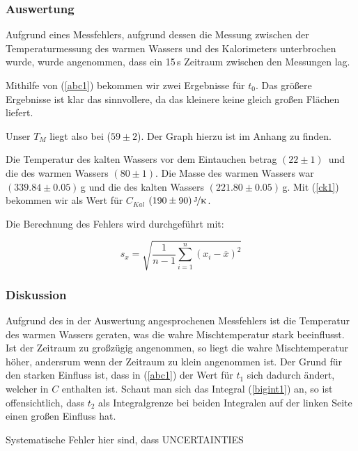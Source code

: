 \documentclass[11pt,a4paper]{article}
\begin{document}
\subsubsection{Auswertung}

Aufgrund eines Messfehlers, aufgrund dessen die Messung zwischen der Temperaturmessung des warmen Wassers und des Kalorimeters unterbrochen wurde, wurde angenommen, dass ein 15\,s Zeitraum zwischen den Messungen lag.

Mithilfe von (\ref{abc1}) bekommen wir zwei Ergebnisse f\"ur $t_0$. Das gr\"o\ss ere Ergebnisse ist klar das sinnvollere, da das kleinere keine gleich gro\ss en Fl\"achen liefert.

Unser $T_M$ liegt also bei ($59\pm2$)\celsius. Der Graph hierzu ist im Anhang zu finden.

Die Temperatur des kalten Wassers vor dem Eintauchen betrag $(22\pm1)$\celsius \ und die des warmen Wassers $(80\pm1)$\celsius. Die Masse des warmen Wassers war $(339.84\pm0.05)$\,g und die des kalten Wassers $(221.80\pm0.05)$\,g. Mit (\ref{ck1}) bekommen wir als Wert f\"ur $C_{Kal}$ $(190\pm90)\,\nicefrac{\mathrm{J}}{\mathrm{K}}$.

Die Berechnung des Fehlers wird durchgef\"uhrt mit:

\begin{equation}
s_x=\sqrt{\frac{1}{n-1}\sum_{i=1}^n(x_i-\overline{x})^2}\label{uncertainty1}
\end{equation}





\subsubsection{Diskussion}

Aufgrund des in der Auswertung angesprochenen Messfehlers ist die Temperatur des warmen Wassers geraten, was die wahre Mischtemperatur stark beeinflusst. Ist der Zeitraum zu gro\ss z\"ugig angenommen, so liegt die wahre Mischtemperatur h\"oher, andersrum wenn der Zeitraum zu klein angenommen ist. Der Grund f\"ur den starken Einfluss ist, dass in (\ref{abc1}) der Wert f\"ur $t_1$ sich dadurch \"andert, welcher in $C$ enthalten ist. Schaut man sich das Integral (\ref{bigint1}) an, so ist offensichtlich, dass $t_2$ als Integralgrenze bei beiden Integralen auf der linken Seite einen gro\ss en Einfluss hat.

Systematische Fehler hier sind, dass UNCERTAINTIES

\pagebreak
\end{document}
